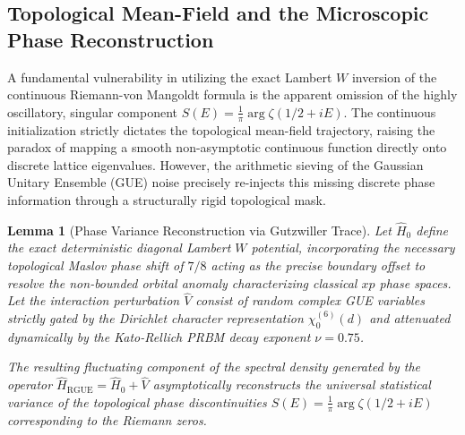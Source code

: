 \documentclass[aps,prl,preprint,superscriptaddress,floatfix]{revtex4-2}
\newtheorem{lemma}[theorem]{Lemma}
\begin{document}
\subsection{Topological Mean-Field and the Microscopic Phase Reconstruction}

A fundamental vulnerability in utilizing the exact Lambert $W$ inversion of the continuous Riemann-von Mangoldt formula is the apparent omission of the highly oscillatory, singular component $S(E) = \frac{1}{\pi} \arg \zeta(1/2+iE)$. The continuous initialization strictly dictates the topological mean-field trajectory, raising the paradox of mapping a smooth non-asymptotic continuous function directly onto discrete lattice eigenvalues. However, the arithmetic sieving of the Gaussian Unitary Ensemble (GUE) noise precisely re-injects this missing discrete phase information through a structurally rigid topological mask.

\begin{lemma}[Phase Variance Reconstruction via Gutzwiller Trace]
\label{lemma:phase_absorption_formal_gutzwiller}
Let $\hat{H}_0$ define the exact deterministic diagonal Lambert $W$ potential, incorporating the necessary topological Maslov phase shift of $7/8$ acting as the precise boundary offset to resolve the non-bounded orbital anomaly characterizing classical $xp$ phase spaces. Let the interaction perturbation $\hat{V}$ consist of random complex GUE variables strictly gated by the Dirichlet character representation $\chi_0^{(6)}(d)$ and attenuated dynamically by the Kato-Rellich PRBM decay exponent $\nu = 0.75$.

The resulting fluctuating component of the spectral density generated by the operator $\hat{H}_{\text{RGUE}} = \hat{H}_0 + \hat{V}$ asymptotically reconstructs the universal statistical variance of the topological phase discontinuities $S(E) = \frac{1}{\pi} \arg \zeta(1/2+iE)$ corresponding to the Riemann zeros.
\end{lemma}
\end{document}
